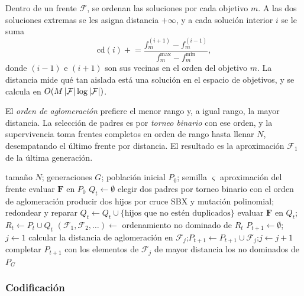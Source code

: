 \begin{definicion}
Dentro de un frente $\mathcal{F}$, se ordenan las soluciones por cada objetivo
$m$. A las dos soluciones extremas se les asigna distancia $+\infty$, y a cada
solución interior $i$ se le suma
\[
  \mathrm{cd}(i)\mathrel{+}=\frac{f_m^{(i+1)}-f_m^{(i-1)}}{f_m^{\max}-f_m^{\min}},
\]
donde $(i-1)$ e $(i+1)$ son sus vecinas en el orden del objetivo $m$. La
distancia mide qué tan aislada está una solución en el espacio de objetivos, y
se calcula en $O(M\left\lvert \mathcal{F} \right\rvert\log\left\lvert \mathcal{F} \right\rvert)$.
\end{definicion}

El \emph{orden de aglomeración} prefiere el menor rango y, a igual rango, la
mayor distancia. La selección de padres es por \emph{torneo binario} con ese
orden, y la supervivencia toma frentes completos en orden de rango hasta
llenar $N$, desempatando el último frente por distancia. El resultado es la
aproximación $\mathcal{F}_1$ de la última generación.

\begin{algorithm}[htbp]
\caption{NSGA-II (esquema general)}
\label{alg:nsga2}
\begin{algorithmic}[1]
\Require tamaño $N$; generaciones $G$; población inicial $P_0$; semilla $\varsigma$
\Ensure aproximación del frente
\State evaluar $\mathbf{F}$ en $P_0$
  \State $Q_t\gets\emptyset$
    \State elegir dos padres por torneo binario con el orden de aglomeración
    \State producir dos hijos por cruce SBX y mutación polinomial; redondear y reparar
    \State $Q_t\gets Q_t\cup\{\text{hijos que no estén duplicados}\}$
  \EndWhile
  \State evaluar $\mathbf{F}$ en $Q_t$;\quad $R_t\gets P_t\cup Q_t$
  \State $(\mathcal{F}_1,\mathcal{F}_2,\dots)\gets$ ordenamiento no dominado de $R_t$
  \State $P_{t+1}\gets\emptyset$;\quad $j\gets1$
    \State calcular la distancia de aglomeración en $\mathcal{F}_j$;\quad $P_{t+1}\gets P_{t+1}\cup\mathcal{F}_j$;\quad $j\gets j+1$
  \EndWhile
  \State completar $P_{t+1}$ con los elementos de $\mathcal{F}_j$ de mayor distancia
\EndFor
\State \Return los no dominados de $P_G$
\end{algorithmic}
\end{algorithm}

\subsubsection{Codificación}

